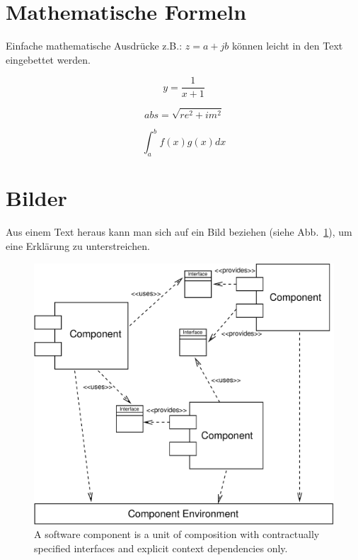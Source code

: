 \begin{appendix}
\section{Mathematische Formeln}

Einfache mathematische Ausdrücke z.B.: $z=a+jb$ können leicht in den
Text eingebettet werden.

\begin{displaymath}
y=\frac{1}{x+1}
\end{displaymath}


\begin{displaymath}
abs = \sqrt{re^2 + im^2}
\end{displaymath}

\begin{displaymath}
\int_{a}^{b} f(x)g(x)dx
\end{displaymath}

\newpage


\section{Bilder}

Aus einem Text heraus kann man sich auf ein Bild beziehen (siehe
Abb.~\ref{ComponentDef}), um eine Erklärung zu unterstreichen.

\begin{figure}[htbp]
    \centering
    \includegraphics [width=12cm,angle=0] {figures/Environment}
    \caption{A software component is a unit of composition with 
        contractually specified interfaces and explicit context 
		dependencies only.}
    \label{ComponentDef}
\end{figure}



\end{appendix}
